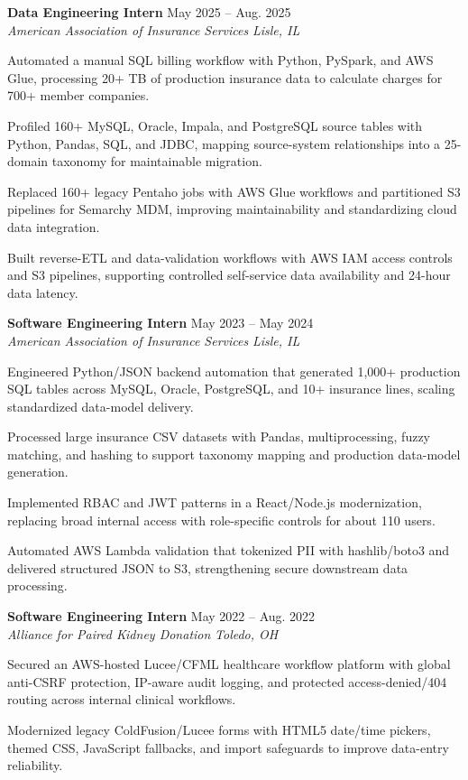 \documentclass[letterpaper,11pt]{article}
\newcommand{\resumeSubheading}[4]{
  \textbf{#1} \hfill #2\\
  \textit{#3} \hfill \textit{#4}
}
\begin{document}
\resumeSubheading
{Data Engineering Intern}{May 2025 -- Aug. 2025}
{American Association of Insurance Services}{Lisle, IL}
\begin{tightitemize}
  \item Automated a manual SQL billing workflow with Python, PySpark, and AWS Glue, processing 20+ TB of production insurance data to calculate charges for 700+ member companies.
  \item Profiled 160+ MySQL, Oracle, Impala, and PostgreSQL source tables with Python, Pandas, SQL, and JDBC, mapping source-system relationships into a 25-domain taxonomy for maintainable migration.
  \item Replaced 160+ legacy Pentaho jobs with AWS Glue workflows and partitioned S3 pipelines for Semarchy MDM, improving maintainability and standardizing cloud data integration.
  \item Built reverse-ETL and data-validation workflows with AWS IAM access controls and S3 pipelines, supporting controlled self-service data availability and 24-hour data latency.
\end{tightitemize}

\resumeSubheading
{Software Engineering Intern}{May 2023 -- May 2024}
{American Association of Insurance Services}{Lisle, IL}
\begin{tightitemize}
  \item Engineered Python/JSON backend automation that generated 1,000+ production SQL tables across MySQL, Oracle, PostgreSQL, and 10+ insurance lines, scaling standardized data-model delivery.
  \item Processed large insurance CSV datasets with Pandas, multiprocessing, fuzzy matching, and hashing to support taxonomy mapping and production data-model generation.
  \item Implemented RBAC and JWT patterns in a React/Node.js modernization, replacing broad internal access with role-specific controls for about 110 users.
  \item Automated AWS Lambda validation that tokenized PII with hashlib/boto3 and delivered structured JSON to S3, strengthening secure downstream data processing.
\end{tightitemize}

\resumeSubheading
{Software Engineering Intern}{May 2022 -- Aug. 2022}
{Alliance for Paired Kidney Donation}{Toledo, OH}
\begin{tightitemize}
  \item Secured an AWS-hosted Lucee/CFML healthcare workflow platform with global anti-CSRF protection, IP-aware audit logging, and protected access-denied/404 routing across internal clinical workflows.
  \item Modernized legacy ColdFusion/Lucee forms with HTML5 date/time pickers, themed CSS, JavaScript fallbacks, and import safeguards to improve data-entry reliability.
\end{tightitemize}
\end{document}
